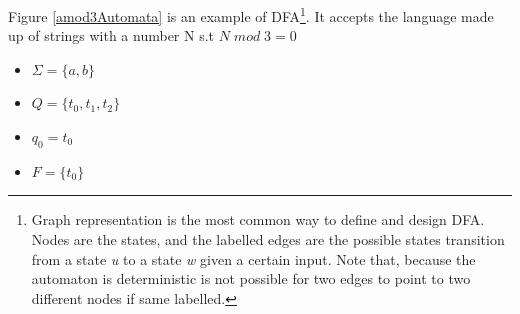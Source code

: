 Figure \ref{amod3Automata} is an example of DFA\footnote{Graph representation
is the most common way to define and design DFA. Nodes are the states, and
the labelled edges are the possible states transition from a state \textit{u}
to a state \textit{w} given a certain input.
Note that, because the automaton is deterministic is not possible for two
edges to point to two different nodes if same labelled.}.
It accepts the language made up of strings with a number N s.t \begin{math}N
\;mod\; 3 = 0 \end{math}
\begin{itemize}
  \item\begin{math} \Sigma = \{a,b\}\end{math}
  \item \begin{math} Q = \{t_0,t_1,t_2\}\end{math}
  \item \begin{math} q_0 = t_0\end{math}
  \item \begin{math} F = \{t_0\} \end{math}
\end{itemize}


